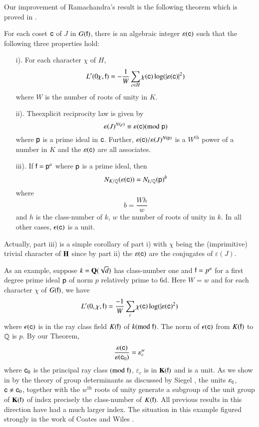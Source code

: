 Our improvement of Ramachandra's result is the following theorem which is proved in \cite[IV]{art9-6}.

\begin{theorem*}
For each coset $\mathsf{c}$ of $J$ in $G(\mathsf{f})$, there is an algebraic integer $\varepsilon (\mathsf{c})$ such that the following three properties hold:
\begin{itemize}
\item[i).] For each character $\chi$ of $H$,
$$
L' (0 \chi, \mathsf{f}) = - \frac{1}{W} \sum\limits_{c \in H} \chi (\mathsf{c}) \log (|\varepsilon (\mathsf{c})|^2) 
$$
where $W$ is the number of roots of unity in $K$.

\item[ii).] The\pageoriginale explicit reciprocity law is given by
$$
\varepsilon (J)^{N(\rho)} \equiv \varepsilon (\mathsf{c}) ({\rm{mod}}\kern.3em \mathsf{p})
$$
where $\mathsf{p}$ is a prime ideal in $\mathsf{c}$. Further, $\varepsilon (\mathsf{c})/ \varepsilon (J)^{N(\mathsf{p})}$ is a $W^{\text{th}}$ power of a number in $K$ and the $\varepsilon (\mathsf{c})$ are all associates. 

\item[iii).] If $\mathsf{f} = \mathsf{p}^a$ where $\mathsf{p}$ is a prime ideal, then
$$
N_{K/\mathbb{Q}} (\varepsilon (\mathsf{c})) = N_{k/\mathbb{Q}} (\mathsf{p})^b
$$
where 
$$
b = \frac{Wh}{w}
$$
and $h$ is the class-number of $k$, $w$ the number of roots of unity in $k$. In all other cases, $\epsilon (\mathsf{c})$ is a unit. 
\end{itemize}
\end{theorem*}

Actually, part iii) is a simple corollary of part i) with $\chi$ being the (imprimitive) trivial character of $\mathbf{H}$ since by part ii) the  $\varepsilon (\mathsf{c})$ are the conjugates of $\varepsilon (J)$.

As an example, suppose $k = \mathbf{Q} (\sqrt{d})$ has class-number one and $\mathsf{f}=p^a$ for a first degree prime ideal $\mathsf{p}$ of norm $p$ relatively prime to 6d. Here $W = w$ and for each character $\chi$ of $G(\mathsf{f})$, we have 
$$
L' (0, \chi, \mathsf{f}) = \frac{-1}{W} \sum\limits_c \chi (\mathsf{c}) \log (|\varepsilon (\mathsf{c})^2)
$$
where $\epsilon (\mathsf{c})$ is in the ray class field $K(\mathsf{f})$ of $k ({\rm{mod}}\kern.3em \mathsf{f})$. The norm of $\epsilon (\mathsf{c})$ from $K(\mathsf{f})$ to $\mathbb{Q}$ is $p$. By our Theorem,
$$
\frac{\varepsilon (\mathsf{c})}{\varepsilon (\mathsf{c}_0)} = \varepsilon_c^w
$$
where $\mathsf{c}_0$ is the principal ray class $({\rm{mod}}\kern.3em \mathsf{f})$, $\varepsilon_c$ is in $\mathbf{K}(\mathsf{f})$ and is a unit. As we show in \cite[IV]{art9-6} by the theory of group determinants as discussed by Siegel \cite{art9-4}, the units $\varepsilon_{\mathsf{c}}$, $\mathsf{c} \neq \mathsf{c}_0$, together with the $w^{\text{th}}$ roots of unity generate a subgroup of the unit group of $\mathbf{K}(\mathsf{f})$ of index precisely the class-number of $K(\mathsf{f})$. All previous results in this direction have had a much larger index. The situation in this example figured strongly in the work of Coates and Wiles \cite{art9-2}.

